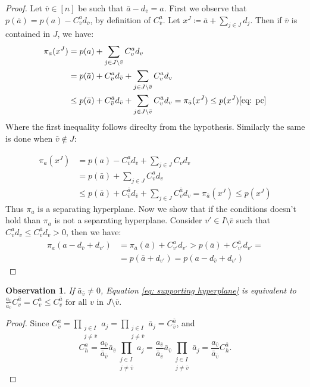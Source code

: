 \documentclass{article}
\newtheorem{observation}[theorem]{Observation}
\begin{document}
\begin{proof}
	Let \(\bar{v} \in [n]\) be such that \(\bar{a} - d_{\bar{v}} = a \).%
	 First we observe that \(p(\bar{a}) = p(a) - C_{\bar{v}}^ad_{\bar{v}}\), by definition of \(C_{\bar{v}}^a\).
	 Let \(x^J \coloneqq \bar{a} + \sum_{j\in J}d_j\).%
	  Then if \(\bar{v}\) is contained in \(J\), we have:
\begin{align}
	\pi_a(x^J) &= p(a) + \sum_{j \in J \setminus{\bar{v}}} C_v^a  d_v\\
	&= p(\bar{a}) + C_{\bar{v}}^ad_{\bar{v}} +  \sum_{j \in J \setminus{\bar{v}}} C_v^a  d_v \label{eq: pc} \\
 &\leq p(\bar{a}) + C_{\bar{v}}^{\bar{a}}d_{\bar{v}} +  \sum_{j \in J \setminus{\bar{v}}}  C_v^{\bar{a}}  d_v = \pi_{\bar{a}}(x^J) \leq p(x^J) 	\eqref{eq: pc}
\end{align}
Where the first inequality follows direclty from the hypothesis.
Similarly the same is done when \(\bar{v} \notin J\):

\begin{align}
	\pi_a(x^J) &= p(a) - C_{\bar{v}}^ad_{\bar{v}}  + \sum_{j \in J} C_v d_v \\
	&= p(\bar{a}) +  \sum_{j \in J } C_v^a d_v  \\
	&\leq p(\bar{a}) + C_{\bar{v}}^{\bar{a}}d_{\bar{v}}  + \sum_{j \in J }  C_v^{\bar{a}} d_v = \pi_{\bar{a}}(x^J) \leq p(x^J)
\end{align}
Thus \(\pi_{a}\) is a separating hyperplane. Now we show that if the conditions doesn't hold than \(\pi_a\) is not a separating hyperplane.
Consider \(v' \in I \setminus \bar{v}\) such that \(C_v^ad_v \leq C_v^{\bar{a}}d_v > 0\), then we have:
\begin{align}
\pi_a(a - d_{\bar{v}} + d_{v'}) &= \pi_{\bar{a}}(\bar{a}) + C_{v'}^{a}d_{v'} > p(\bar{a}) + C_{v'}^{\bar{a}}d_{v'} = 
\\& = p(\bar{a} + d_{v'})= p(a - d_{\bar{v}}+ d_{v'})
\end{align} 
\end{proof}

\begin{observation}
	If \(\bar{a}_{\bar{v}}\neq 0\), Equation \eqref{eq: supporting hyperplane} is equivalent to \(\frac{a_{\bar{v}}}{\bar{a}_{\bar{v}}} C_v^{\bar{a}} = C_v^{a}\leq C_v^{\bar{a}} \text{ for all } v \text{ in } J\setminus{\bar{v}}.\)
\end{observation}
\begin{proof}
Since \( C_{\bar{v}}^a = \prod_{\substack{j \in I \\ j \neq \bar{v}}}a_j = \prod_{\substack{j \in I \\ j \neq \bar{v}}}\bar{a}_j = C_{\bar{v}}^{\bar{a}}\), and 
 \[ C_{h}^a = \frac{a_{\bar{v}}}{\bar{a}_{\bar{v}}}\bar{a}_{\bar{v}}\prod_{\substack{j \in I \\ j \neq \bar{v}}}a_j = \frac{a_{\bar{v}}}{\bar{a}_{\bar{v}}}\bar{a}_{\bar{v}}\prod_{\substack{j \in I \\ j \neq \bar{v}}}\bar{a}_j =  \frac{a_{\bar{v}}}{\bar{a}_{\bar{v}}}C_{h}^{\bar{a}}.\]
\end{proof}
\end{document}

